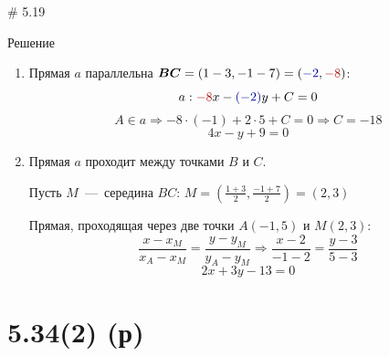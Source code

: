 \documentclass[russian]{beamer}
\begin{document}
  \begin{frame}{\# 5.19}
    \begin{block}{Решение}
      \begin{enumerate}
        \item Прямая $a$ параллельна $\bds{BC} \hm= (1 - 3, -1 - 7) \hm= (\textcolor{my-blue}{-2}, \textcolor{my-red}{-8})$:
        \[
          a: \textcolor{my-red}{-8} x - \textcolor{my-blue}{(-2)} y + C = 0
        \]
        \[
          A \in a \Rightarrow -8 \cdot (-1) + 2 \cdot 5 + C = 0 \Rightarrow C = -18
        \]
        \[
          \boxed{4x - y + 9 = 0}
        \]
        
        \pause
        
        \item Прямая $a$ проходит между точками $B$ и $C$.
        
        Пусть $M$~---~середина $BC$:
        $
          M = \left(\frac{1 + 3}{2}, \frac{-1 + 7}{2}\right) = (2, 3)
        $
        
        Прямая, проходящая через две точки $A(-1, 5)$ и $M(2, 3)$:
        \[
          \frac{x - x_M}{x_A - x_M} = \frac{y - y_M}{y_A - y_M}
          \Rightarrow
          \frac{x - 2}{-1 - 2} = \frac{y - 3}{5 - 3}
        \]
        \[
          \boxed{2x + 3y - 13 = 0}
        \]
      \end{enumerate}
    \end{block}
  \end{frame}
    
    
  \section{5.34(2) (р)}
  
\end{document}
